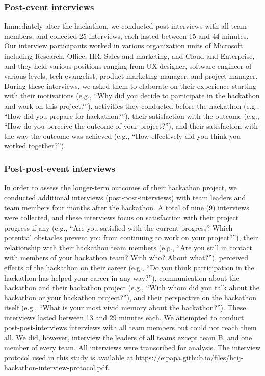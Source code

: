 \documentclass{hcij}
\begin{document}
\subsubsection{Post-event interviews}
Immediately after the hackathon, we conducted post-interviews with all team members, and collected 25 interviews, each lasted between 15 and 44 minutes. Our interview participants worked in various organization units of Microsoft including Research, Office, HR, Sales and marketing, and Cloud and Enterprise, and they held various positions ranging from UX designer, software engineer of various levels, tech evangelist, product marketing manager, and project manager. During these interviews, we asked them to elaborate on their experience starting with their motivations (e.g., “Why did you decide to participate in the hackathon and work on this project?”), activities they conducted before the hackathon (e.g., “How did you prepare for hackathon?”), their satisfaction with the outcome (e.g., “How do you perceive the outcome of your project?”), and their satisfaction with the way the outcome was achieved (e.g., “How effectively did you think you worked together?”).

\subsubsection{Post-post-event interviews}
In order to assess the longer-term outcomes of their hackathon project, we conducted additional interviews (post-post-interviews) with team leaders and team members four months after the hackathon. A total of nine (9) interviews were collected, and these interviews focus on satisfaction with their project progress if any (e.g., “Are you satisfied with the current progress? Which potential obstacles prevent you from continuing to work on your project?”), their relationship with their hackathon team members (e.g., “Are you still in contact with members of your hackathon team? With who? About what?”), perceived effects of the hackathon on their career (e.g., “Do you think participation in the hackathon has helped your career in any way?”), communication about the hackathon and their hackathon project (e.g., “With whom did you talk about the hackathon or your hackathon project?”), and their perspective on the hackathon itself (e.g., “What is your most vivid memory about the hackathon?”). These interviews lasted between 13 and 29 minutes each. We attempted to conduct post-post-interviews interviews with all team members but could not reach them all. We did, however, interview the leaders of all teams except team B, and one member of every team. All interviews were transcribed for analysis. The interview protocol used in this study is available at https://eipapa.github.io/files/hcij-hackathon-interview-protocol.pdf.
\end{document}
